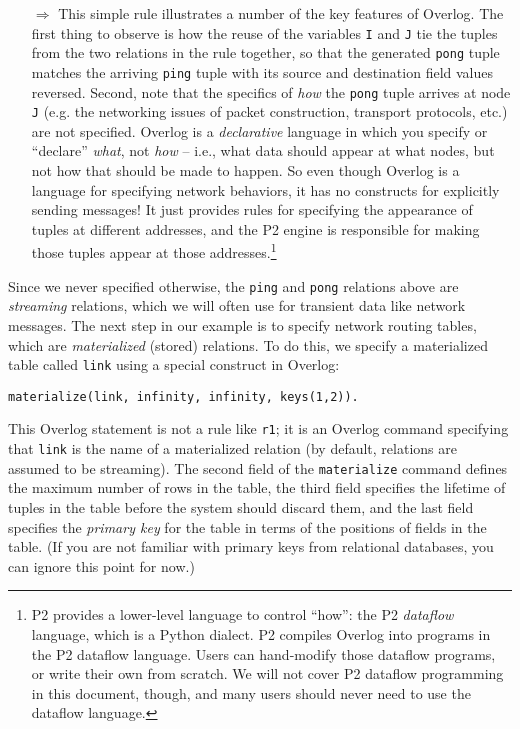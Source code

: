 \documentclass{article}
\begin{document}
\begin{itemize}
\item[$\Longrightarrow$] This simple rule illustrates a number of the
  key features of Overlog.  The first thing to observe is how the
  reuse of the variables \lstinline$I$ and \lstinline$J$ tie the
  tuples from the two relations in the rule together, so that the
  generated \lstinline$pong$ tuple matches the arriving
  \lstinline$ping$ tuple with its source and destination field values
  reversed.  Second, note that the specifics of {\em how} the
  \lstinline$pong$ tuple arrives at node \lstinline$J$ (e.g. the
  networking issues of packet construction, transport protocols, etc.)
  are not specified.  Overlog is a {\em declarative} language in which
  you specify or ``declare'' {\em what}, not {\em how} -- i.e., what
  data should appear at what nodes, but not how that should be made to
  happen.  So even though Overlog is a language for specifying network
  behaviors, it has no constructs for explicitly sending messages!  It
  just provides rules for specifying the appearance of tuples at
  different addresses, and the P2 engine is responsible for making
  those tuples appear at those addresses.\footnote{P2 provides a
    lower-level language to control ``how'': the P2 {\em
      dataflow} language, which is a Python dialect.  P2 compiles
    Overlog into programs in the P2 dataflow language. Users can
    hand-modify those dataflow programs, or write their own from
    scratch.  We will not cover P2 dataflow programming in this
    document, though, and many users should never need to use the
    dataflow language.}
\end{itemize}


\noindent
Since we never specified otherwise, the \lstinline$ping$ and
\lstinline$pong$ relations above are {\em streaming} relations, which
we will often use for transient data like network messages.  The next
step in our example is to specify network routing tables, which are
{\em materialized} (stored) relations.  To do this, we specify a
materialized table called \lstinline$link$ using a special construct
in Overlog:

\begin{lstlisting}
materialize(link, infinity, infinity, keys(1,2)).
\end{lstlisting}
This Overlog statement is not a rule like \lstinline$r1$; it is an
Overlog command specifying that \lstinline$link$ is the name of a
materialized relation (by default, relations are assumed to be
streaming).  The second field of the \lstinline$materialize$ command
defines the maximum number of rows in the table, the third field
specifies the lifetime of tuples in the table before the system should
discard them, and the last field specifies the {\em primary key} for
the table in terms of the positions of fields in the table.  (If you
are not familiar with primary keys from relational databases, you can
ignore this point for now.)  
\end{document}
